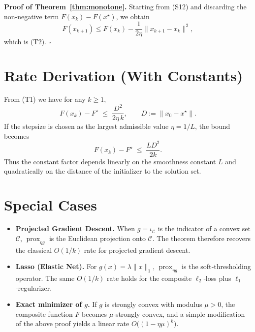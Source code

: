 \documentclass{article}
\newcommand{\prox}{\operatorname{prox}}
\begin{document}
\noindent\textbf{Proof of Theorem~\ref{thm:monotone}.}  
Starting from (S12) and discarding the non‑negative term $F(x_{k})-F(x^{\star})$, we obtain
\[
F(x_{k+1})\le F(x_{k})-\frac{1}{2\eta}\|x_{k+1}-x_{k}\|^{2},
\]
which is (T2). $\square$

\section*{Rate Derivation (With Constants)}
From (T1) we have for any $k\ge1$,
\[
F(x_{k})-F^{\star}\;\le\;\frac{D^{2}}{2\eta\,k},
\qquad D:=\|x_{0}-x^{\star}\|.
\]
If the stepsize is chosen as the largest admissible value $\eta=1/L$, the bound becomes
\[
F(x_{k})-F^{\star}\;\le\;\frac{L D^{2}}{2k}.
\]
Thus the constant factor depends linearly on the smoothness constant $L$ and quadratically on the distance of the initializer to the solution set.

\section*{Special Cases}
\begin{itemize}
\item \textbf{Projected Gradient Descent.} When $g=\iota_{\mathcal{C}}$ is the indicator of a convex set $\mathcal{C}$, $\prox_{\eta g}$ is the Euclidean projection onto $\mathcal{C}$. The theorem therefore recovers the classical $O(1/k)$ rate for projected gradient descent.
\item \textbf{Lasso (Elastic Net).} For $g(x)=\lambda\|x\|_{1}$, $\prox_{\eta g}$ is the soft‑thresholding operator. The same $O(1/k)$ rate holds for the composite $\ell_{2}$‑loss plus $\ell_{1}$‑regularizer.
\item \textbf{Exact minimizer of $g$.} If $g$ is strongly convex with modulus $\mu>0$, the composite function $F$ becomes $\mu$‑strongly convex, and a simple modification of the above proof yields a linear rate $O\big((1-\eta\mu)^{k}\big)$.
\end{itemize}
\end{document}
